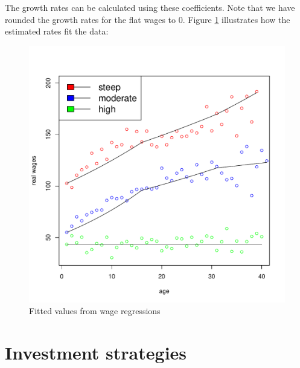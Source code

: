 \documentclass[]{elsarticle}
\begin{document}
\begin{appendix}
The growth rates can be calculated using these coefficients. Note that we have rounded the growth rates for the flat wages to $0$. Figure \ref{fig:heterwage} illustrates how the estimated rates fit the data:

\begin{figure}[h!]
	\centering
	\includegraphics[scale=0.3]{figs/heterwage.pdf}
	\caption{Fitted values from wage regressions}
	\label{fig:heterwage}
\end{figure}


\newpage
\section{Investment strategies}
\label{invstrat}


\end{appendix}
\end{document}
